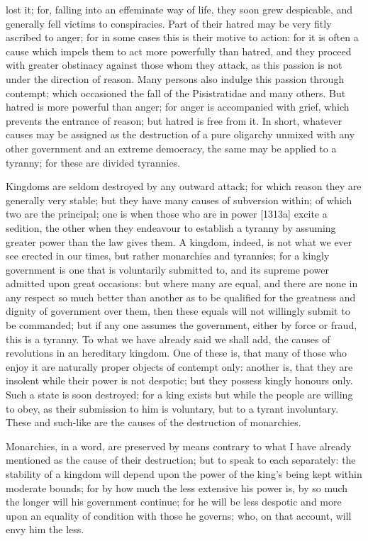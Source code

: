 lost it; for, falling into an effeminate way of life, they soon grew
despicable, and generally fell victims to conspiracies. Part of their
hatred may be very fitly ascribed to anger; for in some cases this is
their motive to action: for it is often a cause which impels them to act
more powerfully than hatred, and they proceed with greater obstinacy
against those whom they attack, as this passion is not under the direction
of reason. Many persons also indulge this passion through contempt; which
occasioned the fall of the Pisistratidae and many others. But hatred is
more powerful than anger; for anger is accompanied with grief, which
prevents the entrance of reason; but hatred is free from it. In short,
whatever causes may be assigned as the destruction of a pure oligarchy
unmixed with any other government and an extreme democracy, the same may
be applied to a tyranny; for these are divided tyrannies.

Kingdoms are seldom destroyed by any outward attack; for which reason they
are generally very stable; but they have many causes of subversion within;
of which two are the principal; one is when those who are in power [1313a]
excite a sedition, the other when they endeavour to establish a tyranny by
assuming greater power than the law gives them. A kingdom, indeed, is not
what we ever see erected in our times, but rather monarchies and
tyrannies; for a kingly government is one that is voluntarily submitted
to, and its supreme power admitted upon great occasions: but where many
are equal, and there are none in any respect so much better than another
as to be qualified for the greatness and dignity of government over them,
then these equals will not willingly submit to be commanded; but if any
one assumes the government, either by force or fraud, this is a tyranny.
To what we have already said we shall add, the causes of revolutions in an
hereditary kingdom. One of these is, that many of those who enjoy it are
naturally proper objects of contempt only: another is, that they are
insolent while their power is not despotic; but they possess kingly
honours only. Such a state is soon destroyed; for a king exists but while
the people are willing to obey, as their submission to him is voluntary,
but to a tyrant involuntary. These and such-like are the causes of the
destruction of monarchies.


Monarchies, in a word, are preserved by means contrary to what I have
already mentioned as the cause of their destruction; but to speak to each
separately: the stability of a kingdom will depend upon the power of the
king's being kept within moderate bounds; for by how much the less
extensive his power is, by so much the longer will his government
continue; for he will be less despotic and more upon an equality of
condition with those he governs; who, on that account, will envy him the
less.

